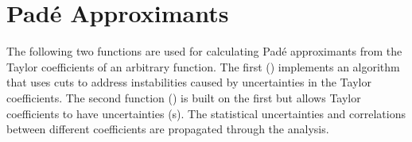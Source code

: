 \documentclass[letterpaper,10pt,english]{sphinxmanual}
\begin{document}
\section{Padé Approximants}
\label{\detokenize{g2tools:pade-approximants}}
The following two functions are used for calculating Padé approximants from
the Taylor coefficients of an arbitrary function. The first
({\hyperref[\detokenize{g2tools:g2tools.pade_svd}]{}}) implements an algorithm that uses  cuts to
address instabilities caused  by uncertainties in the Taylor coefficients. The
second function ({\hyperref[\detokenize{g2tools:g2tools.pade_gvar}]{}}) is built on the first but allows
Taylor coefficients to have uncertainties (s). The statistical
uncertainties and correlations between different coefficients are propagated
through the analysis.
\end{document}
